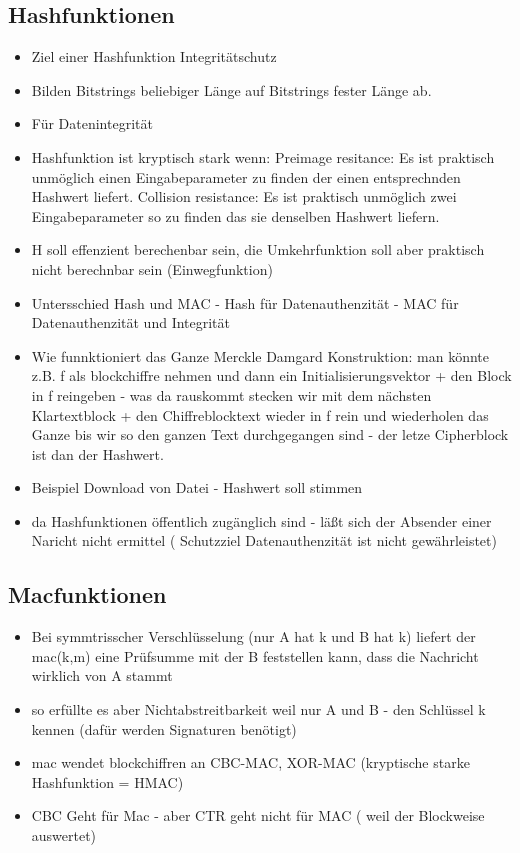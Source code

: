 \documentclass[a4paper,10pt]{scrartcl}
\begin{document}
      \subsection{Hashfunktionen}
      \begin{itemize}
       \item Ziel einer Hashfunktion Integritätschutz
       \item Bilden Bitstrings beliebiger Länge auf Bitstrings fester Länge ab.
       \item Für Datenintegrität
       \item Hashfunktion ist kryptisch stark wenn: Preimage resitance: Es ist praktisch unmöglich einen Eingabeparameter zu finden der einen entsprechnden Hashwert liefert.
                                                    Collision resistance: Es ist praktisch unmöglich zwei Eingabeparameter so zu finden das sie denselben Hashwert liefern.
       \item H soll effenzient berechenbar sein, die Umkehrfunktion soll aber praktisch nicht berechnbar sein (Einwegfunktion)
       
       \item Untersschied Hash und MAC - Hash für Datenauthenzität - MAC für Datenauthenzität und Integrität
       \item Wie funnktioniert das Ganze Merckle Damgard Konstruktion: man könnte z.B. f als blockchiffre nehmen und dann ein Initialisierungsvektor + den Block in f reingeben - was da rauskommt stecken wir
       mit dem nächsten Klartextblock + den Chiffreblocktext wieder in f rein und wiederholen das Ganze bis wir so den ganzen Text durchgegangen sind - der letze Cipherblock
       ist dan der Hashwert.
       \item Beispiel Download von Datei - Hashwert soll stimmen
       \item da Hashfunktionen öffentlich zugänglich sind - läßt sich der Absender einer Naricht nicht ermittel ( Schutzziel Datenauthenzität ist nicht gewährleistet)
               \end{itemize}
      
       \subsection{Macfunktionen}
       \begin{itemize}
        \item Bei symmtrisscher Verschlüsselung (nur A hat k und B hat k) liefert der mac(k,m) eine Prüfsumme mit der B feststellen kann, dass die Nachricht wirklich von A stammt
        \item so erfüllte es aber Nichtabstreitbarkeit weil nur A und B - den Schlüssel k kennen (dafür werden Signaturen benötigt)
        \item mac wendet blockchiffren an CBC-MAC, XOR-MAC (kryptische starke Hashfunktion = HMAC)
        \item CBC Geht für Mac - aber CTR geht nicht für MAC ( weil der Blockweise auswertet)
       \end{itemize}
\end{document}
